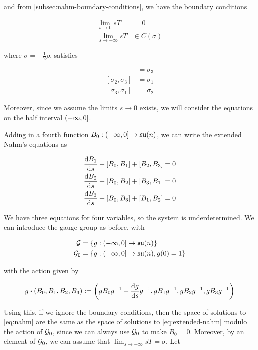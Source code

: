 \documentclass{report}
\newcommand{\su}{\mathfrak{su}}
\renewcommand{\sl}{\mathfrak{sl}}
\begin{document}
and from \cref{subsec:nahm-boundary-conditions}, we have the boundary conditions

\begin{align*}
    \lim_{s \to 0}sT &= 0 \\
    \lim_{s \to -\infty}sT &\in C(\sigma)
\end{align*}

where \(\sigma = -\frac12\rho\), satisfies

\begin{align*}
    [\sigma_1, \sigma_2] &= \sigma_3 \\
    [\sigma_2, \sigma_3] &= \sigma_1 \\
    [\sigma_3, \sigma_1] &= \sigma_2
\end{align*}

Moreover, since we assume the limits \(s \to 0\) exists, we will consider the equations on the half interval \((-\infty, 0]\).

Adding in a fourth function \(B_0 : \Ioc{-\infty, 0} \to \su(n)\), we can write the extended Nahm's equations as

\begin{equation}
    \label{eq:extended-nahm}
    \begin{split}
        \dv{B_1}{s} + [B_0, B_1] + [B_2, B_3] &= 0 \\
        \dv{B_2}{s} + [B_0, B_2] + [B_3, B_1] &= 0 \\
        \dv{B_3}{s} + [B_0, B_3] + [B_1, B_2] &= 0
    \end{split}
\end{equation}

We have three equations for four variables, so the system is underdetermined. We can introduce the gauge group as before, with

\begin{align*}
    \mcG &= \left\{g : \Ioc{-\infty, 0} \to \su(n)\right\} \\
    \mcG_0 &= \left\{g : \Ioc{-\infty, 0} \to \su(n), g(0) = 1\right\}
\end{align*}

with the action given by

\[g \vdot (B_0, B_1, B_2, B_3) := \left(gB_0g^{-1} - \dv{g}{s}g^{-1}, gB_1g^{-1}, gB_2g^{-1}, gB_3g^{-1}\right)\]

Using this, if we ignore the boundary conditions, then the space of solutions to \cref{eq:nahm} are the same as the space of solutions to \cref{eq:extended-nahm} modulo the action of \(\mathcal{G}_0\), since we can always use \(\mathcal{G}_0\) to make \(B_0 = 0\). Moreover, by an element of \(\mathcal{G}_0\), we can assume that \(\lim_{s \to -\infty}sT = \sigma\). Let
\end{document}

